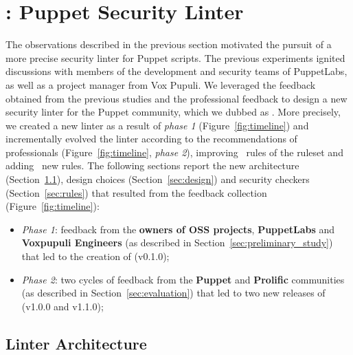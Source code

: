\section{\toolname: Puppet Security Linter}\label{sec:tool}

The observations described in the previous section motivated the 
pursuit of a more precise security linter for Puppet scripts. 
The previous experiments ignited discussions with members 
of the development and security teams of PuppetLabs, as well 
as a project manager from Vox Pupuli. We leveraged the feedback 
obtained from the previous studies and the professional feedback to
design a new security linter for the Puppet
community, which we dubbed as \toolname{}. More precisely, we created 
a new linter as a result of \textit{phase 1} (Figure~\ref{fig:timeline}) 
and incrementally evolved the linter according to the recommendations of professionals 
(Figure~\ref{fig:timeline}, \textit{phase 2}), improving
\noRulesSlic\ rules of the \slic{} ruleset and adding
\newRules\ new rules. 
The following sections report the new architecture (Section~\ref{sec:architecture}), 
design choices (Section~\ref{sec:design}) and security checkers (Section~\ref{sec:rules}) that resulted
from the feedback collection (Figure~\ref{fig:timeline}): 
\begin{itemize}
  \item \textit{Phase 1}: feedback from the \textbf{owners of OSS projects},  
  \textbf{PuppetLabs} and \textbf{Voxpupuli Engineers} (as described in 
  Section~\ref{sec:preliminary_study}) that led to the creation of \toolname{} (v0.1.0);
  \item \textit{Phase 2}: two cycles of feedback from the \textbf{Puppet} and \textbf{Prolific} 
  communities (as described in Section~\ref{sec:evaluation}) that led to two new releases of 
  \toolname{} (v1.0.0 and v1.1.0);
\end{itemize}


\subsection{Linter Architecture}\label{sec:architecture}

